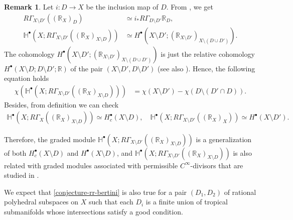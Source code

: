 \documentclass[a4paper,dvipdfmx,reqno,12pt]{amsart}
\theoremstyle{definition}
\newtheorem{remark}[theorem]{Remark}
\numberwithin{equation}{section}
\begin{document}
\begin{remark}
Let $i\colon D\to X$ be the inclusion map of $D$.
From 
\cite[(2.3.20)]{MR1299726}, we get
\begin{align}
R\Gamma_{X\setminus D'}((\mathbb{R}_X)_D)
&\simeq i_* R\Gamma_{D\setminus D'}\mathbb{R}_D, \\ 
\mathbb{H}^{\bullet}(X;R\Gamma_{X\setminus D'}((\mathbb{R}_X)_{X\setminus D}))
&\simeq H^{\bullet}(X\setminus D';(\mathbb{R}_{X\setminus D'})_{X\setminus (D\cup D')}).
\end{align}
The cohomology $H^{\bullet}(X\setminus D';(\mathbb{R}_{X\setminus D'})_{X\setminus (D\cup D')})$
is just the relative cohomology 
$H^{\bullet}(X\setminus D;D\setminus D';\mathbb{R})$
of the pair
$(X\setminus D', D\setminus D')$
\cite[Chapter IV. Definition 8.1]{MR842190}
(see also \cite[Chapter II. Proposition 12.3]{MR1481706}).
Hence, the following equation holds
\begin{align}
\chi(\mathbb{H}^{\bullet}(X;R\Gamma_{X\setminus D'}((\mathbb{R}_X)_{X\setminus D})))
&=\chi(X\setminus D')
- \chi(D\setminus (D'\cap D)).
\end{align}
Besides, from definition we can check
\begin{align}
\mathbb{H}^{\bullet}(X;R\Gamma_{X}
((\mathbb{R}_X)_{X\setminus D}))
\simeq H^{\bullet}_c(X\setminus D), \quad
\mathbb{H}^{\bullet}(X;R\Gamma_{X\setminus D'}
((\mathbb{R}_X)_{X}))
\simeq H^{\bullet}(X\setminus D').
\end{align}

Therefore, the graded module 
$\mathbb{H}^{\bullet}(X;R\Gamma_{X\setminus D'}
((\mathbb{R}_X)_{X\setminus D}))$
is a generalization of both
$H^{\bullet}_c(X\setminus D)$ and
$H^{\bullet}(X\setminus D)$, and
$\mathbb{H}^{\bullet}(X;R\Gamma_{X\setminus D'}
((\mathbb{R}_X)_{X\setminus D}))$ is also related
with graded modules associated with
permissible $C^{\infty}$-divisors that are
studied in \cite{tsutsui2023graded}.

We expect that \cref{conjecture-rr-bertini}
is also true for a pair $(D_1,D_2)$ of rational polyhedral
subspaces on $X$ such that each $D_i$ is
a finite union of tropical submanifolds whose
intersections satisfy a good condition.
\end{remark}

\appendix
\end{document}
